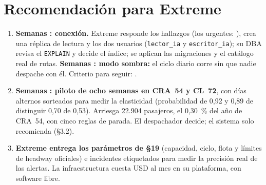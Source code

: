 \documentclass[10pt,a4paper]{article}
\begin{document}
\section{Recomendación para Extreme}
\begin{enumerate}
\item \textbf{Semanas \PlanSemanasConexion: conexión.} Extreme responde los hallazgos (los urgentes:
  \PlanHallazgosUrgentes), crea una réplica de lectura y los dos usuarios (\texttt{lector\_ia} y \texttt{escritor\_ia}); su DBA revisa el
  \texttt{EXPLAIN} y decide el índice; se aplican las migraciones y el catálogo real de rutas. \textbf{Semanas
  \PlanSemanasSombra: modo sombra:} el ciclo diario corre sin que nadie despache con él. Criterio para seguir:
  \PlanCriterioSombra. 
\item \textbf{Semanas \PlanSemanasPiloto: piloto de ocho semanas en CRA~54 y CL~72}, con días alternos sorteados para
  medir la elasticidad (probabilidad de 0,92 y 0,89 de distinguir 0,70 de 0,53). Arriesga 22.904 pasajeros, el
  0,30~\% del año de CRA~54, con cinco reglas de parada. El despachador decide; el sistema solo recomienda (§3.2).
\item \textbf{Extreme entrega los parámetros de §19} (capacidad, ciclo, flota y límites de headway oficiales) e
  incidentes etiquetados para medir la precisión real de las alertas. La infraestructura cuesta USD \PlanCostoTotalA{}
  al mes en su plataforma, con software libre. 
\end{enumerate}
\end{document}
